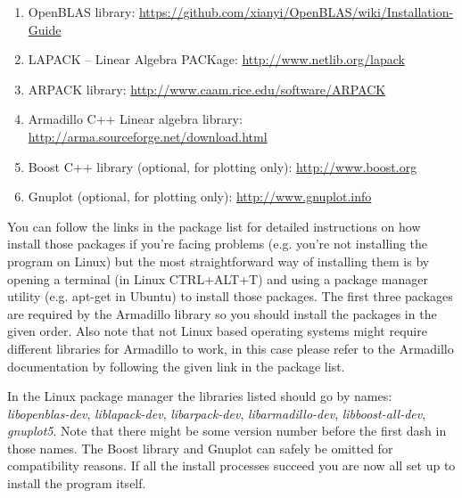 \documentclass[english,12pt,a4paper,pdftex,sci,utf8]{aaltothesis}
\begin{document}
\begin{enumerate}
\item OpenBLAS library: \url{https://github.com/xianyi/OpenBLAS/wiki/Installation-Guide}
\item LAPACK -- Linear Algebra PACKage: \url{http://www.netlib.org/lapack}
\item ARPACK library: \url{http://www.caam.rice.edu/software/ARPACK}
\item Armadillo C++ Linear algebra library: \url{http://arma.sourceforge.net/download.html} 
\item Boost C++ library (optional, for plotting only): \url{http://www.boost.org}
\item Gnuplot (optional, for plotting only): \url{http://www.gnuplot.info}
\end{enumerate}
You can follow the links in the package list for detailed instructions on how install those packages if you're facing problems (e.g. you're not installing the program on Linux) but the most straightforward way of installing them is by opening a terminal (in Linux CTRL+ALT+T) and using a package manager utility (e.g. apt-get in Ubuntu) to install those packages. The first three packages are required by the Armadillo library so you should install the packages in the given order. Also note that not Linux based operating systems might require different libraries for Armadillo to work, in this case please refer to the Armadillo documentation by following the given link in the package list. 
\par In the Linux package manager the libraries listed should go by names: \textit{libopenblas-dev}, \textit{liblapack-dev}, \textit{libarpack-dev}, \textit{libarmadillo-dev}, \textit{libboost-all-dev}, \textit{gnuplot5}. %
Note that there might be some version number before the first dash in those names. The Boost library and Gnuplot can safely be omitted for compatibility reasons. If all the install processes succeed you are now all set up to install the program itself.
\end{document}
